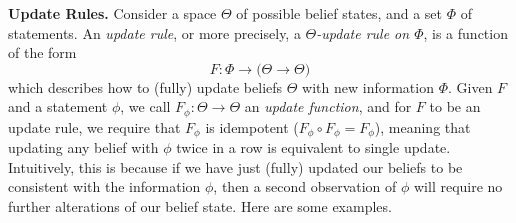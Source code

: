 \documentclass{article}
\begin{document}
\textbf{Update Rules.}
Consider a space $\Theta$
of possible belief states,
and a set $\Phi$ of statements.
An \emph{update rule}, or more precisely, a \emph{$\Theta$-update rule on $\Phi$},
is a function of the form
\[
    F :  \Phi \to \Big( \Theta \to \Theta \Big)
\]
which describes how to (fully) update beliefs $\Theta$ with new information $\Phi$.
Given $F$ and a statement $\phi$, we call $F_\phi : \Theta \to \Theta$ an \emph{update function},
and for $F$ to be an update rule, we require that $F_\phi$ is
idempotent ($F_\phi \circ F_\phi = F_\phi$), meaning that updating any belief with $\phi$ twice in a row is equivalent to single update.
Intuitively, this is because if we have just ({fully}) updated our beliefs to be consistent with the information $\phi$, then a second observation of $\phi$ will require no further alterations of our belief state.
Here are some examples.
\end{document}
